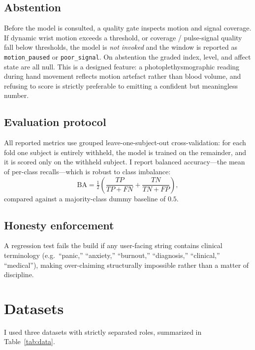 \documentclass[11pt,a4paper]{article}
\begin{document}
\subsection{Abstention}
\label{sec:abstention}
Before the model is consulted, a quality gate inspects motion and signal coverage. If dynamic wrist
motion exceeds a threshold, or coverage / pulse-signal quality fall below thresholds, the model is
\emph{not invoked} and the window is reported as \texttt{motion\_paused} or \texttt{poor\_signal}.
On abstention the graded index, level, and affect state are all null. This is a designed feature: a
photoplethysmographic reading during hand movement reflects motion artefact rather than blood
volume, and refusing to score is strictly preferable to emitting a confident but meaningless number.

\subsection{Evaluation protocol}
All reported metrics use grouped leave-one-subject-out cross-validation: for each fold one subject
is entirely withheld, the model is trained on the remainder, and it is scored only on the withheld
subject. I report balanced accuracy---the mean of per-class recalls---which is robust to class
imbalance:
\begin{equation}
\mathrm{BA} = \tfrac{1}{2}\!\left(\frac{TP}{TP+FN} + \frac{TN}{TN+FP}\right),
\end{equation}
compared against a majority-class dummy baseline of $0.5$.

\subsection{Honesty enforcement}
A regression test fails the build if any user-facing string contains clinical terminology (e.g.\
``panic,'' ``anxiety,'' ``burnout,'' ``diagnosis,'' ``clinical,'' ``medical''), making over-claiming
structurally impossible rather than a matter of discipline.

\section{Datasets}

I used three datasets with strictly separated roles, summarized in Table~\ref{tab:data}.
\end{document}
